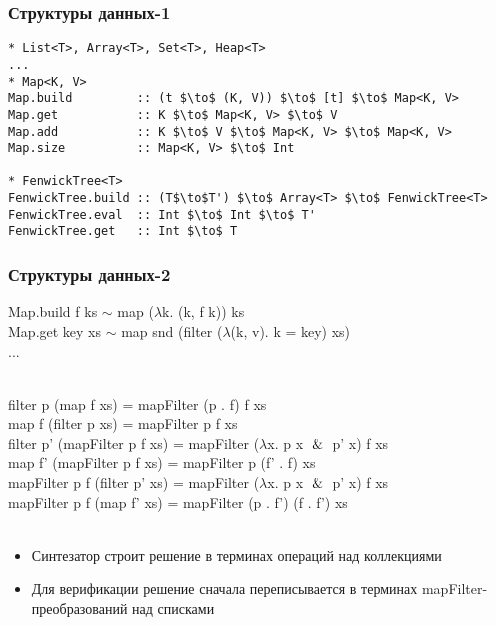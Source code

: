 \documentclass[14pt]{beamer}
\begin{document}
\begin{frame}[fragile]
\frametitle{Структуры данных-1}
\begin{lstlisting}[language=CollectionLang, mathescape=true]
* List<T>, Array<T>, Set<T>, Heap<T>
...
* Map<K, V>
Map.build         :: (t $\to$ (K, V)) $\to$ [t] $\to$ Map<K, V>
Map.get           :: K $\to$ Map<K, V> $\to$ V
Map.add           :: K $\to$ V $\to$ Map<K, V> $\to$ Map<K, V>
Map.size          :: Map<K, V> $\to$ Int

* FenwickTree<T>
FenwickTree.build :: (T$\to$T') $\to$ Array<T> $\to$ FenwickTree<T> 
FenwickTree.eval  :: Int $\to$ Int $\to$ T'
FenwickTree.get   :: Int $\to$ T
\end{lstlisting}

\end{frame}


\begin{frame}
\frametitle{Структуры данных-2}
\small{
{\color{blue}Map}.build f ks $\sim$ {\color{blue}map} ($\lambda$k. (k, f k)) ks\\
{\color{blue}Map}.get key xs $\sim$ {\color{blue}map} snd (filter ($\lambda$(k, v). k = key) xs) \\
... \\ \\
}

\small{
{\color{red}filter} p ({\color{brown}map} f xs)           =  {\color{blue}mapFilter} (p . f) f xs \\
{\color{brown}map} f ({\color{red}filter} p xs)           =  {\color{blue}mapFilter} p     f xs \\
{\color{red}filter} p' ({\color{blue}mapFilter} p f xs)  =  {\color{blue}mapFilter} ($\lambda$x. p x $\And$ p' x) f xs \\
{\color{brown}map} f' ({\color{blue}mapFilter} p f xs)     =  {\color{blue}mapFilter} p (f' . f) xs \\
{\color{blue}mapFilter} p f ({\color{red}filter} p' xs)  =  {\color{blue}mapFilter} ($\lambda$x. p x $\And$ p' x) f xs \\
{\color{blue}mapFilter} p f ({\color{brown}map} f' xs)     =  {\color{blue}mapFilter} (p . f') (f . f') xs \\
}
\\
\begin{itemize}
\item Синтезатор строит решение в терминах операций над коллекциями
\item Для верификации решение сначала переписывается в терминах {\color{blue}mapFilter}-преобразований над списками
\end{itemize}
\end{frame}
\end{document}
